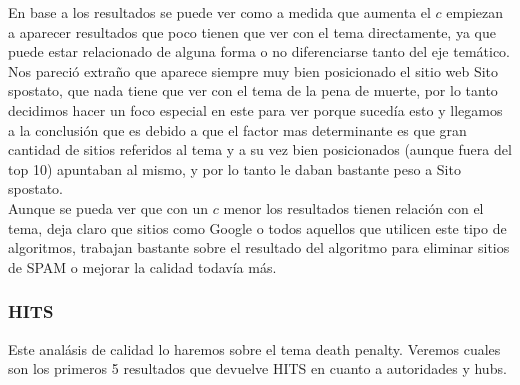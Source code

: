 En base a los resultados se puede ver como a medida que aumenta el $c$ empiezan a aparecer resultados que poco tienen que ver con el tema directamente, ya que puede estar relacionado de alguna forma o no diferenciarse tanto del eje temático.\\
Nos pareció extraño que aparece siempre muy bien posicionado el sitio web Sito spostato, que nada tiene que ver con el tema de la pena de muerte, por lo tanto decidimos hacer un foco especial en este para ver porque sucedía esto y llegamos a la conclusión que es debido a que el factor mas determinante es que gran cantidad de sitios referidos al tema y a su vez bien posicionados (aunque fuera del top 10) apuntaban al mismo, y por lo tanto le daban bastante peso a Sito spostato.\\
Aunque se pueda ver que con un $c$ menor los resultados tienen relación con el tema, deja claro que sitios como Google o todos aquellos que utilicen este tipo de algoritmos, trabajan bastante sobre el resultado del algoritmo para eliminar sitios de SPAM o mejorar la calidad todavía más.

\subsubsection{HITS}
Este analásis de calidad lo haremos sobre el tema death penalty. Veremos cuales son los primeros 5 resultados que devuelve HITS en cuanto a autoridades y hubs.




